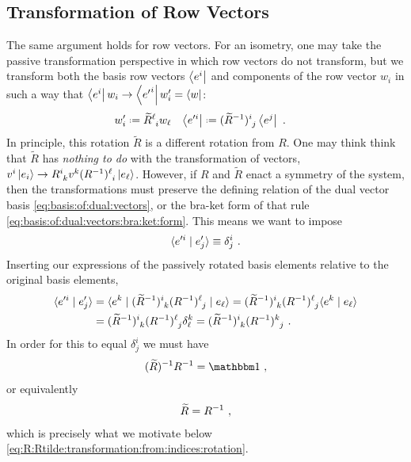 \subsection{Transformation of Row Vectors}

The same argument holds for row vectors. For an isometry, one may take the passive transformation perspective in which row vectors do not transform, but we transform both the basis row vectors $\left\langle e^i\right|$ and components of the row vector $w_i$ in such a way that $\left\langle e^i\right|w_i \to \left\langle{e'}^i\right|w'_i = \left\langle w\right|$: 
\begin{align}
    w'_i &\defeq \tilde R\aij{\ell}{i} w_\ell
    &
    \bra{e'^i} &\defeq  (\tilde{R}\inv)\aij{i}{j}\bra{e^j} \ .
    \label{eq:passive:transformation:of:row:vector:and:basis}
\end{align}
In principle, this rotation $\tilde R$ is a different rotation from $R$. One may think think that $\tilde R$ has \emph{nothing to do} with the transformation of vectors, $v^i\ket{e_i} \to R\aij{i}{k}v^k(R\inv)\aij{\ell}{i}\ket{e_\ell}$. However, if $R$ and $\tilde R$ enact a symmetry of the system, then the transformations must preserve the defining relation of the dual vector basis \eqref{eq:basis:of:dual:vectors}, or the bra-ket form of that rule \eqref{eq:basis:of:dual:vectors:bra:ket:form}. This means we want to impose
\begin{align}
    \langle e'^i \mid e'_j \rangle \equiv \delta^i_j \ .
    \label{eq:basis:transform:under:rotation}
\end{align}
Inserting our expressions of the passively rotated basis elements relative to the original basis elements,
\begin{align}
    \la e'^i \mid e'_j \ra &= 
    \la e^k \mid (\tilde{R}\inv)\aij{i}{k} (R\inv)\aij{\ell}{j} \mid e_\ell \ra
    =
    (\tilde{R}\inv)\aij{i}{k} (R\inv)\aij{\ell}{j} \la e^k \mid e_\ell \ra
    \\
    &=
    (\tilde{R}\inv)\aij{i}{k} (R\inv)\aij{\ell}{j} \delta^k_\ell
    =
    (\tilde{R}\inv)\aij{i}{k} (R\inv)\aij{k}{j} \ .
\end{align}
In order for this to equal $\delta^i_j$ we must have
\begin{align}
    (\tilde R)\inv R\inv = \one \ ,
\end{align}
or equivalently
\begin{align}
    \widetilde R = R^{-1} \ ,
\end{align}
which is precisely what we motivate below \eqref{eq:R:Rtilde:transformation:from:indices:rotation}. 


